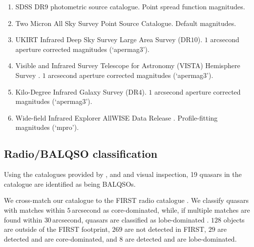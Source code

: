 \begin{enumerate}

 \item SDSS DR$9$ photometric source catalogue. Point spread function magnitudes. 

 \item Two Micron All Sky Survey \citep[$2$MASS;][]{skrutskie06} Point Source Catalogue. Default magnitudes.

 \item UKIRT Infrared Deep Sky Survey \citep[UKIDSS;][]{lawrence07} Large Area Survey (DR$10$). $1$ arcsecond aperture corrected magnitudes (`apermag3').   

 \item Visible and Infrared Survey Telescope for Astronomy (VISTA) Hemisphere Survey \citep[VHS;][]{mcmahon13}. $1$ arcsecond aperture corrected magnitudes (`apermag$3$').   

 \item Kilo-Degree Infrared Galaxy \citep[VIKING;][]{edge13} Survey (DR$4$). $1$ arcsecond aperture corrected magnitudes (`apermag$3$').

 \item Wide-field Infrared Explorer \citep[WISE;][]{wright10} AllWISE Data Release \citep{mainzer11}. Profile-fitting magnitudes (`mpro').

\end{enumerate}

\subsection{Radio/BALQSO classification}
\label{sec:ch2-flags}

Using the catalogues provided by \citet{shen11}, \citet{allen11} and \citet{paris17} and visual inspection, 19 quasars in the catalogue are identified as being  BALQSOs.  

We cross-match our catalogue to the FIRST radio catalogue \citep{white97}. 
We classify quasars with matches within $5$\,arcsecond as core-dominated, while, if multiple matches are found within $30$\,arcsecond, quasars are classified as lobe-dominated \citep[e.g.][]{shen11}. 
$128$ objects are outside of the FIRST footprint, $269$ are not detected in FIRST, $29$ are detected and are core-dominated, and $8$ are detected and are lobe-dominated. 


